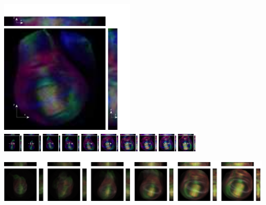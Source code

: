 \documentclass[10pt]{article}
\begin{document}
\centering 
\noindent
{}
\includegraphics[width=6.5cm]{wing_disc_example}
%
\hfill
%
\includegraphics[width=10cm]{wing_disc_ordered}

\vspace{0.25cm}
\noindent
{}
\includegraphics[width=17.5cm]{wing_disc_average}
\end{document}
